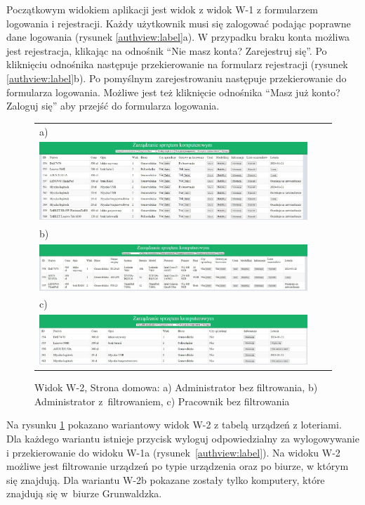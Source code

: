 Początkowym widokiem aplikacji jest widok z widok W-1 z formularzem logowania i rejestracji. Każdy użytkownik musi się zalogować podając poprawne dane logowania (rysunek \ref{authview:label}a). W przypadku braku konta możliwa jest rejestracja, klikając na odnośnik "`Nie masz konta? Zarejestruj się"'. Po kliknięciu odnośnika następuje przekierowanie na formularz rejestracji (rysunek \ref{authview:label}b). Po pomyślnym zarejestrowaniu następuje przekierowanie do formularza logowania. Możliwe jest też kliknięcie odnośnika "`Masz już konto? Zaloguj się"' aby przejść do formularza logowania.
\begin{figure}[htb]
  \centering
	\begin{tabular}{@{}lll@{}}
	a)\\
  \includegraphics[width=\textwidth]{rys05/view/alldevices.pdf} \\
	
	b)\\
	\includegraphics[width=\textwidth]{rys05/view/compGrun.pdf} \\
	c) \\
	\includegraphics[width=\textwidth]{rys05/view/pracownikHome.pdf}
	\end{tabular}
  \caption{Widok W-2, Strona domowa: a) Administrator bez filtrowania, b) Administrator z~filtrowaniem, c) Pracownik bez filtrowania}
  \label{home:label}
\end{figure}

Na rysunku \ref{home:label} pokazano wariantowy widok W-2 z tabelą urządzeń z loteriami. Dla każdego wariantu istnieje przycisk wyloguj odpowiedzialny za wylogowywanie i przekierowanie do widoku W-1a (rysunek~\ref{authview:label}). Na widoku W-2 możliwe jest filtrowanie urządzeń po typie urządzenia oraz po biurze, w którym się znajdują. Dla wariantu W-2b pokazane zostały tylko komputery, które znajdują się w~biurze Grunwaldzka. 

